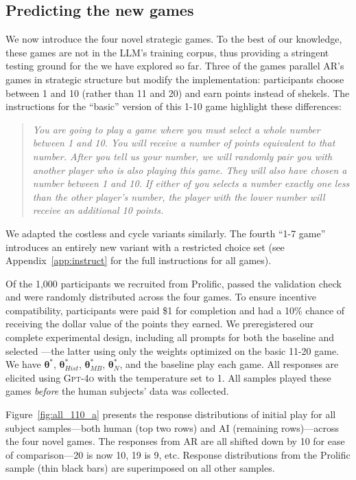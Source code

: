 \subsection{Predicting the new games}
\label{sec:predict_new_games}

We now introduce the four novel strategic games.
To the best of our knowledge, these games are not in the LLM's training corpus, thus providing a stringent testing ground for the  we have explored so far.
Three of the games parallel AR's games in strategic structure but modify the implementation: participants choose between 1 and 10 (rather than 11 and 20) and earn points instead of shekels.
The instructions for the ``basic'' version of this 1-10 game highlight these differences:
\begin{quote}
\vspace{-.5cm}
\singlespacing
\emph{You are going to play a game where you must select a whole number between 1 and 10.
You will receive a number of points equivalent to that number.
After you tell us your number, we will randomly pair you with another player who is also playing this game. They will also have chosen a number between 1 and 10.
If either of you selects a number exactly one less than the other player's number, the player with the lower number will receive an additional 10 points.}
\end{quote}
We adapted the costless and cycle variants similarly.
The fourth ``1-7 game'' introduces an entirely new variant with a restricted choice set (see Appendix~\ref{app:instruct} for the full instructions for all games). 

Of the 1,000 participants we recruited from Prolific, \NTotal{} passed the validation check and were randomly distributed across the four games.
To ensure incentive compatibility, participants were paid \$1 for completion and had a 10\% chance of receiving the dollar value of the points they earned.
We preregistered our complete experimental design, including all prompts for both the baseline and selected ---the latter using only the weights optimized on the basic 11-20 game.
We have $\bm{\theta}^*$, $\bm{\theta}^*_{Hist}$, $\bm{\theta}^*_{MB}$, $\bm{\theta}^*_{N}$, and the baseline play each game.
All \aisub{} responses are elicited using \textsc{Gpt-4o} with the temperature set to 1.
All \aisub{} samples played these games \emph{before} the human subjects' data was collected.

Figure~\ref{fig:all_110_a} presents the response distributions of initial play for all subject samples---both human (top two rows) and AI (remaining rows)---across the four novel games. 
The responses from AR are all shifted down by 10 for ease of comparison---20 is now 10, 19 is 9, etc.
Response distributions from the Prolific sample (thin black bars) are superimposed on all other samples.

